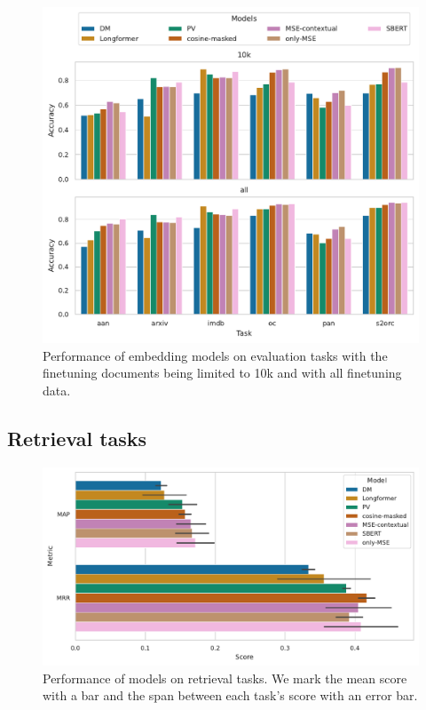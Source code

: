 \begin{figure}

  \centering
  \includegraphics[width=\textwidth]{img/final_cls_evals.pdf}

  \caption{Performance of embedding models on evaluation tasks with the finetuning documents being limited to 10k and with all finetuning data.}

  \label{fig:final_cls_evals}

\end{figure}

\subsection{Retrieval tasks}

\begin{figure}

  \includegraphics[width=\textwidth]{img/final_sims_evals.pdf}

  \caption{Performance of models on retrieval tasks. We mark the mean score
  with a bar and the span between each task's score with an error bar.}

  \label{fig:final_eval_sims}

\end{figure}

